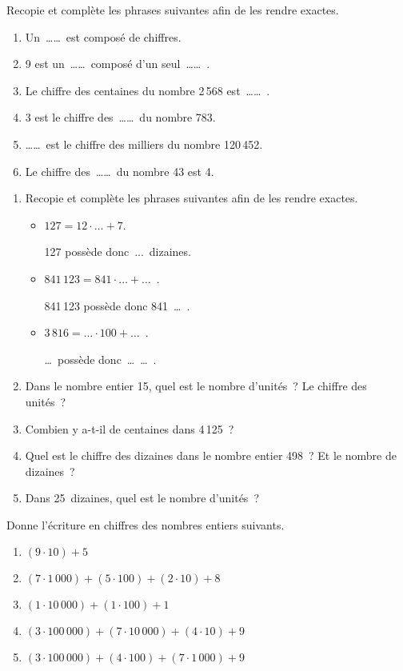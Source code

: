 


\begin{exercice}
Recopie et complète les phrases suivantes afin de les rendre exactes.
\begin{enumerate}
 \item Un …… est composé de chiffres.
 \item 9 est un …… composé d'un seul …… .
 \item Le chiffre des centaines du nombre 2\,568 est …… .
 \item 3 est le chiffre des …… du nombre 783.
 \item …… est le chiffre des milliers du nombre 120\,452.
 \item Le chiffre des …… du nombre 43 est 4.
\end{enumerate}
\end{exercice}


\begin{exercice}
\begin{enumerate}
 \item Recopie et complète les phrases suivantes afin de les rendre exactes.
 \begin{itemize}
  \item $127 = 12 \cdot \ldots + 7$.
  
  127 possède donc ... dizaines.
  \item $841\,123 = 841 \cdot \ldots + \ldots$ .
  
  841\,123 possède donc 841 \ldots .
  \item $3\,816 = \ldots \cdot 100 + \ldots$ .
  
  \ldots possède donc \ldots \ldots .
  \end{itemize}
 \item Dans le nombre entier 15, quel est le nombre d'unités ? Le chiffre des unités ?
 \item Combien y a-t-il de centaines dans 4\,125 ?
 \item Quel est le chiffre des dizaines dans le nombre entier 498 ? Et le nombre de dizaines ?
 \item Dans 25 dizaines, quel est le nombre d'unités ?
 \end{enumerate}
\end{exercice}


\begin{exercice}
Donne l'écriture en chiffres des nombres entiers suivants.
\begin{enumerate}
 \item $(9 \cdot 10) + 5$
 \item $(7 \cdot 1\,000) + (5 \cdot 100) + (2 \cdot 10) + 8$
 \item $(1 \cdot 10\,000) + (1 \cdot 100) + 1$
 \item  $(3 \cdot 100\,000) + (7 \cdot 10\,000) + (4 \cdot 10) + 9$
 \item  $(3 \cdot 100\,000) + (4 \cdot 100) + (7 \cdot 1\,000) + 9$
 \end{enumerate}
\end{exercice}


